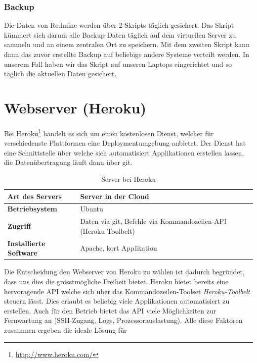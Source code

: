 \subsubsection{Backup}
Die Daten von Redmine werden über 2 Skripts täglich gesichert. 
Das Skript  kümmert sich darum alle Backup-Daten täglich auf dem virtuellen Server zu sammeln und an einem zentralen Ort zu speichern.
Mit dem zweiten Skript  kann dann das zuvor erstellte Backup auf beliebige andere Systeme verteilt werden.
In unserem Fall haben wir das Skript auf unseren Laptops eingerichtet und so täglich die aktuellen Daten gesichert.


\section{Webserver (Heroku)}

Bei Heroku\footnote{\url{http://www.heroku.com/}} handelt es sich um einen kostenlosen Dienst, welcher für verschiedenste Plattformen eine Deploymentumgebung anbietet. 
Der Dienst hat eine Schnittstelle über welche sich automatisiert Applikationen erstellen lassen, die Datenübertragung läuft dann über \gls{git}.

\begin{table}[H]
\centering
\begin{tabular}{|p{0.25\twocelltabwidth}|p{0.75\twocelltabwidth}|}
\hline 
\small{\textbf{Art des Servers}} & Server in der \gls{Cloud} \\
\hline 
\small{\textbf{Betriebsystem}} & Ubuntu \\
\hline 
\small{\textbf{Zugriff}} & Daten via \gls{git}, Befehle via Kommandozeilen-API (Heroku Toolbelt) \\
\hline 
\small{\textbf{Installierte Software}} & Apache, kort Applikation \\
\hline 
\end{tabular} 
\caption{Server bei Heroku}
\label{infrastruktur-heroku-tabelle}
\end{table}

Die Entscheidung den Webserver von Heroku zu wählen ist dadurch begründet, dass uns dies die grösstmögliche Freiheit bietet. 
Heroku bietet bereits eine hervoragende \gls{API} welche sich über das Kommandozeilen-Toolset \emph{Heroku-Toolbelt} steuern lässt.
Dies erlaubt es beliebig viele Applikationen automatisiert zu erstellen.
Auch für den Betrieb bietet das API viele Möglichkeiten zur Fernwartung an (SSH-Zugang, Logs, Prozessorauslastung).
Alle diese Faktoren zusammen ergeben die ideale Lösung für 

